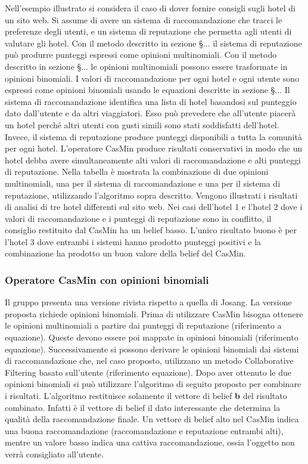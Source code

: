 \documentclass{report}
\begin{document}
	Nell'esempio illustrato si considera il caso di dover fornire consigli
	sugli hotel di un sito web. Si assume di avere un sistema di
	raccomandazione che tracci le preferenze degli utenti, e un sistema di
	reputazione che permetta agli utenti di valutare gli hotel. Con il
	metodo descritto in sezione §... il sistema di reputazione può produrre
	punteggi espressi come opinioni multinomiali. Con il metodo descritto in
	sezione §... le opinioni multinomiali possono essere trasformate in
	opinioni binomiali. I valori di raccomandazione per ogni hotel e ogni
	utente sono espressi come opinioni binomiali usando le equazioni
	descritte in sezione §... Il sistema di raccomandazione identifica una
	lista di hotel basandosi sul punteggio dato dall'utente e da altri
	viaggiatori. Esso può prevedere che all'utente piacerà un hotel perché
	altri utenti con gusti simili sono stati soddisfatti dell'hotel. Invece,
	il sistema di reputazione produce punteggi disponibili a tutta la
	comunità per ogni hotel. L'operatore CasMin produce risultati
	conservativi in modo che un hotel debba avere simultaneamente alti
	valori di raccomandazione e alti punteggi di reputazione. Nella tabella
	è mostrata la combinazione di due opinioni multinomiali, una per il
	sistema di raccomandazione e una per il sistema di reputazione,
	utilizzando l'algoritmo sopra descritto. Vengono illustrati i risultati
	di analisi di tre hotel differenti sul sito web. Nei casi dell'hotel 1 e
	l'hotel 2 dove i valori di raccomandazione e i punteggi di reputazione
	sono in conflitto, il consiglio restituito dal CasMin ha un belief
	basso. L'unico risultato buono è per l'hotel 3 dove entrambi i sistemi
	hanno prodotto punteggi positivi e la combinazione ha prodotto un buon
	valore della belief del CasMin.
	
	\hypertarget{header-n192}{%
		\subsubsection{Operatore CasMin con opinioni
			binomiali}\label{header-n192}}
	
	Il gruppo presenta una versione rivista rispetto a quella di Josang. La
	versione proposta richiede opinioni binomiali. Prima di utilizzare
	CasMin bisogna ottenere le opinioni multinomiali a partire dai punteggi
	di reputazione (riferimento a equazione). Queste devono essere poi
	mappate in opinioni binomiali (riferimento equazione). Successivamente
	si possono derivare le opinioni binomiali dai sistemi di raccomandazione
	che, nel caso proposto, utilizzano un metodo Collaborative Filtering
	basato sull'utente (riferimento equazione). Dopo aver ottenuto le due
	opinioni binomiali si può utilizzare l'algoritmo di seguito proposto per
	combinare i risultati. L'algoritmo restituisce solamente il vettore di
	belief \textbf{b} del risultato combinato. Infatti è il vettore di
	belief il dato interessante che determina la qualità della
	raccomandazione finale. Un vettore di belief alto nel CasMin indica una
	buona raccomandazione (raccomandazione e reputazione entrambi alti),
	mentre un valore basso indica una cattiva raccomandazione, ossia
	l'oggetto non verrà consigliato all'utente.
	
\end{document}
